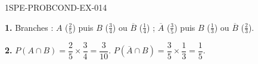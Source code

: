 \begin{corrige}{1SPE-PROBCOND-EX-014}

\textbf{1.} Branches : $A$ ($\frac{2}{5}$) puis $B$ ($\frac{3}{4}$) ou $\overline{B}$ ($\frac{1}{4}$) ; $\overline{A}$ ($\frac{3}{5}$) puis $B$ ($\frac{1}{3}$) ou $\overline{B}$ ($\frac{2}{3}$).

\medskip
\textbf{2.} $P(A \cap B) = \dfrac{2}{5} \times \dfrac{3}{4} = \dfrac{3}{10}$. $P(\overline{A} \cap B) = \dfrac{3}{5} \times \dfrac{1}{3} = \dfrac{1}{5}$.

\end{corrige}
